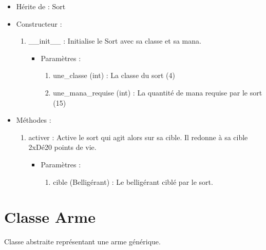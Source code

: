 \documentclass[12pt,pdftex,oneside]{article}
\begin{document}
  \begin{itemize}
  \item Hérite de : Sort


  \item Constructeur : 

  \begin{enumerate}
  \item \_\_init\_\_ : Initialise le Sort avec sa classe et sa mana.
    \begin{itemize}
    \item Paramètres : 
      \begin{enumerate}
      \item une\_classe (int) : La classe du sort (4)
      \item une\_mana\_requise (int) : La quantité de mana requise par le sort (15)
      \end{enumerate}
    \end{itemize}

  \end{enumerate}

  \item Méthodes : 

    \begin{enumerate}
    \item activer : Active le sort qui agit alors sur sa cible. Il redonne à sa
      cible 2xDé20 points de vie.
      \begin{itemize}
      \item Paramètres : 
        \begin{enumerate}
        \item cible (Belligérant) : Le belligérant ciblé par le sort.
        \end{enumerate}
      \end{itemize}
    \end{enumerate}

  \end{itemize}

  \section {Classe Arme}

  Classe abstraite représentant une arme générique.
\end{document}
